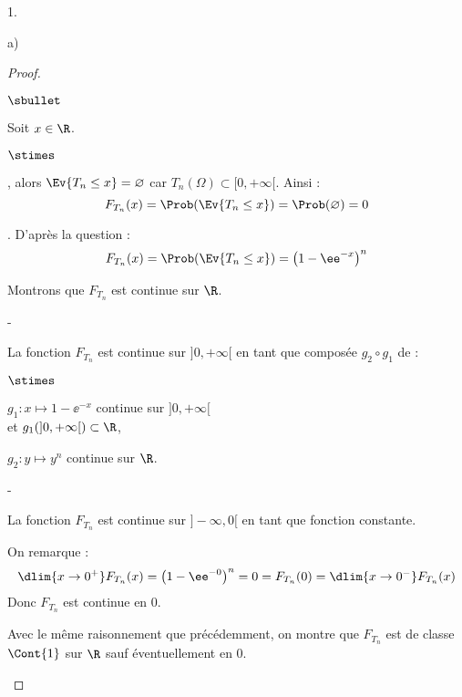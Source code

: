 \documentclass[11pt]{article}%
\begin{document}
\begin{noliste}{1.}
\begin{noliste}{a)}
\begin{proof}
\begin{noliste}{$\sbullet$}
    \item Soit $x\in\R$.
    \begin{noliste}{$\stimes$}
      \item {}, alors $\Ev{T_n \leq x} =
      \varnothing$ car $T_n(\Omega) \subset [0,+\infty[$. Ainsi :
      \[
       F_{T_n}(x)=\Prob(\Ev{T_n \leq x}) = \Prob(\varnothing) = 0
      \]
      
      \item {}. D'après la question  :
      \[
       F_{T_n}(x) = \Prob(\Ev{T_n \leq x}) = \left(1-\ee^{-x}\right)^n
      \]
    \end{noliste}
    
    \item Montrons que $F_{T_n}$ est continue sur $\R$.
    \begin{noliste}{-}
      \item La fonction $F_{T_n}$ est continue sur $]0,+\infty[$ en 
      tant que composée $g_2 \circ g_1$ de :
    \end{noliste}
      \begin{liste}{$\stimes$}
      \item $g_1 : x \mapsto 1-\ee^{-x}$ continue sur $]0,+\infty[$ \\
        et $g_1(]0,+\infty[) \subset \R$,
      \item $g_2 : y \mapsto y^n$ continue sur $\R$.
      \end{liste}
    \begin{noliste}{-}
      \item La fonction $F_{T_n}$ est continue sur $]-\infty,0[$ en 
      tant que fonction constante.
      
      \item On remarque :
      \[
       \dlim{x\to 0^+} F_{T_n}(x)=\left(1-\ee^{-0}\right)^n = 0
       =F_{T_n}(0)=\dlim{x\to 0^-} F_{T_n}(x)
      \]
      Donc $F_{T_n}$ est continue en $0$.
    \end{noliste}
    
  \item Avec le même raisonnement que précédemment, on montre que
    $F_{T_n}$ est de classe $\Cont{1}$ sur $\R$ sauf éventuellement en
    $0$.%
    

\end{noliste}
\end{proof}
\end{noliste}
\end{noliste}
\end{document}
